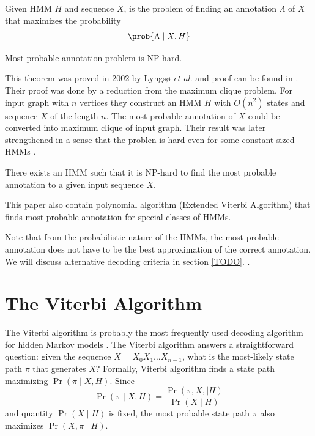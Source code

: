 \begin{definition}
Given HMM $H$ and sequence $X$,  is the problem of finding an annotation $\Lambda$ of $X$ that maximizes
the probability \[\prob{\Lambda\mid X,H}\]
\end{definition}

\begin{theorem}
Most probable annotation problem is NP-hard.
\end{theorem}
This theorem was proved in 2002 by Lyngsø {\it et al.} and proof can be found in
\cite{Lyngso2002}. Their proof was done by a reduction from the maximum clique problem.
For input graph with $n$ vertices they construct an HMM $H$ with $O(n^2)$ states and
sequence $X$ of the length $n$. The most probable annotation of $X$ could be
converted into maximum clique of input graph. 
Their result was later strengthened in a sense that the problen is hard even for some constant-sized HMMs \cite{Brejova2007mpa}.

\begin{theorem}
There exists an HMM such that it is NP-hard to find the most probable annotation
to a given input sequence $X$.
\end{theorem}
This paper also
contain polynomial algorithm (Extended Viterbi Algorithm) that finds most
probable annotation for special classes of HMMs. 

Note that from the probabilistic nature of the HMMs, the most probable
annotation does not have to be the best approximation of the correct annotation.
We will discuss alternative decoding criteria in section \ref{TODO}.
\nocite{Brown2010,Gross2007,Nanasi2010,Truszkowski2011}.

\section{The Viterbi Algorithm}
The Viterbi algorithm  is probably the most frequently used
decoding algorithm for hidden Markov
models \cite{Durbin1998}.
The Viterbi algorithm answers a straightforward question: given the sequence
$X=X_0X_1\dots X_{n-1}$, what
is the most-likely state path $\pi$ that generates $X$? Formally, Viterbi
algorithm finds a state path maximizing $\Pr\left( \pi\mid X,H \right)$. Since
\[\Pr\left(\pi\mid X,H\right) = \frac{\Pr\left(\pi,X,\mid
H\right)}{\Pr\left(X\mid H\right)}\] and quantity $\Pr\left(X\mid H\right)$ is
fixed, the most probable state path $\pi$ also maximizes $\Pr\left(X,\pi\mid H\right)$. 

